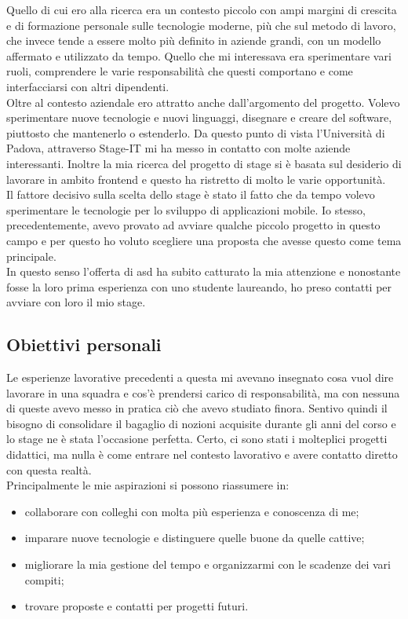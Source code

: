 Quello di cui ero alla ricerca era un contesto piccolo con ampi margini di crescita e di formazione personale sulle tecnologie moderne, più
che sul metodo di lavoro, che invece tende a essere molto più definito in aziende grandi, con un modello affermato e utilizzato da tempo.
Quello che mi interessava era sperimentare vari ruoli, comprendere le varie responsabilità che questi comportano e come interfacciarsi con
altri dipendenti. \\
Oltre al contesto aziendale ero attratto anche dall'argomento del progetto. Volevo sperimentare nuove tecnologie e nuovi linguaggi,
disegnare e creare del software, piuttosto che mantenerlo o estenderlo. Da questo punto di vista l'Università di Padova,
attraverso Stage-IT mi ha messo in contatto con molte aziende interessanti. Inoltre la mia ricerca del progetto di stage si è basata sul desiderio
di lavorare in ambito frontend e questo ha ristretto di molto le varie opportunità. \\
Il fattore decisivo sulla scelta dello stage è stato il fatto che da tempo volevo sperimentare le tecnologie per lo sviluppo di applicazioni
mobile. Io stesso, precedentemente, avevo provato ad avviare qualche piccolo progetto in questo campo e per questo ho voluto
scegliere una proposta che avesse questo come tema principale. \\
In questo senso l'offerta di \acrlong{asd} ha subito catturato la mia attenzione e nonostante fosse la loro prima esperienza con uno
studente laureando, ho preso contatti per avviare con loro il mio stage.

\subsection{Obiettivi personali}
\label{sec:obiettivi-pers}
Le esperienze lavorative precedenti a questa mi avevano insegnato cosa vuol dire lavorare in una squadra e cos'è prendersi carico
di responsabilità, ma con nessuna di queste avevo messo in pratica ciò che avevo studiato finora. Sentivo quindi il bisogno di consolidare
il bagaglio di nozioni acquisite durante gli anni del corso e lo stage ne è stata l'occasione perfetta. Certo, ci sono stati i molteplici
progetti didattici, ma nulla è come entrare nel contesto lavorativo e avere contatto diretto con questa realtà. \\
Principalmente le mie aspirazioni si possono riassumere in:
\begin{itemize}
	\item collaborare con colleghi con molta più esperienza e conoscenza di me;
	\item imparare nuove tecnologie e distinguere quelle buone da quelle cattive;
	\item migliorare la mia gestione del tempo e organizzarmi con le scadenze dei vari compiti;
	\item trovare proposte e contatti per progetti futuri.
\end{itemize}

